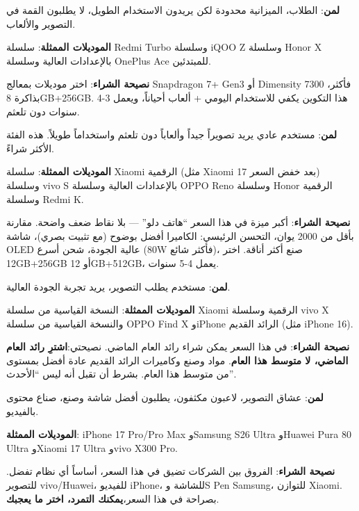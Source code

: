 
\textbf{لمن}: الطلاب، الميزانية محدودة لكن يريدون الاستخدام الطويل، لا يطلبون القمة في التصوير والألعاب.

\textbf{الموديلات الممثلة}: سلسلة Redmi Turbo وسلسلة iQOO Z وسلسلة Honor X بالإعدادات العالية وسلسلة OnePlus Ace للمبتدئين.

\textbf{نصيحة الشراء}: اختر موديلات بمعالج Snapdragon 7+ Gen3 أو Dimensity 7300 فأكثر، بذاكرة 8GB+256GB. هذا التكوين يكفي للاستخدام اليومي + ألعاب أحياناً، ويعمل 3-4 سنوات دون تلعثم.


\textbf{لمن}: مستخدم عادي يريد تصويراً جيداً وألعاباً دون تلعثم واستخداماً طويلاً. هذه الفئة الأكثر شراءً.

\textbf{الموديلات الممثلة}: سلسلة Xiaomi الرقمية (مثل Xiaomi 17 بعد خفض السعر) وسلسلة vivo S بالإعدادات العالية وسلسلة OPPO Reno وسلسلة Honor الرقمية وسلسلة Redmi K.

\textbf{نصيحة الشراء}: أكبر ميزة في هذا السعر “هاتف دلو” — بلا نقاط ضعف واضحة. مقارنة بأقل من 2000 يوان، التحسن الرئيسي: الكاميرا أفضل بوضوح (مع تثبيت بصري)، شاشة OLED عالية الجودة، شحن أسرع (80W فأكثر شائع)، صنع أكثر أناقة. اختر 12GB+256GB أو 12GB+512GB، يعمل 4-5 سنوات.


\textbf{لمن}: مستخدم يطلب التصوير، يريد تجربة الجودة العالية.

\textbf{الموديلات الممثلة}: النسخة القياسية من سلسلة Xiaomi الرقمية وسلسلة vivo X والنسخة القياسية من سلسلة OPPO Find X وiPhone الرائد القديم (مثل iPhone 16).

\textbf{نصيحة الشراء}: في هذا السعر يمكن شراء رائد العام الماضي. نصيحتي:\textbf{اشترِ رائد العام الماضي، لا متوسط هذا العام}. مواد وصنع وكاميرات الرائد القديم عادة أفضل بمستوى من متوسط هذا العام. بشرط أن تقبل أنه ليس “الأحدث”.


\textbf{لمن}: عشاق التصوير، لاعبون مكثفون، يطلبون أفضل شاشة وصنع، صناع محتوى بالفيديو.

\textbf{الموديلات الممثلة}: iPhone 17 Pro/Pro Max وSamsung S26 Ultra وHuawei Pura 80 Ultra وXiaomi 17 Ultra وvivo X300 Pro.

\textbf{نصيحة الشراء}: الفروق بين الشركات تضيق في هذا السعر، أساساً أي نظام تفضل. للتصوير vivo/Huawei، للفيديو iPhone، للشاشة وS Pen Samsung، للتوازن Xiaomi. بصراحة في هذا السعر،\textbf{يمكنك التمرد، اختر ما يعجبك}.

